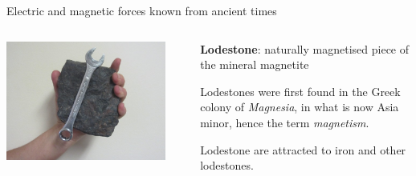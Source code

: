 \begin{frame}{Electric and magnetic forces known from ancient times}
\begin{columns}
  \begin{column}{0.20\textwidth}
   \begin{center}
      \includegraphics[width=0.90\textwidth]{./images/photos/lodestone_1.jpg}\\
   \end{center}
  \end{column}
  \begin{column}{0.80\textwidth}
   \begin{itemize}
    {\small
     \item {\bf Lodestone}: naturally magnetised piece of the mineral magnetite
     \begin{itemize}
     {\scriptsize
       \item Lodestones were first found in the Greek colony of {\em Magnesia},
             in what is now Asia minor, hence the term {\em magnetism}.
     }
     \end{itemize}
     \item Lodestone are attracted to iron and other lodestones.
    }
    \end{itemize}
  \end{column}
\end{columns}

\end{frame}


%
%
%

